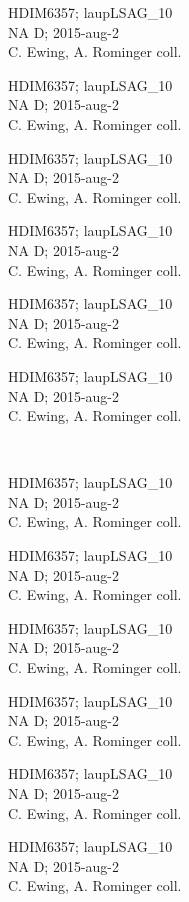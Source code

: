 \documentclass[2pt]{extarticle}
\begin{document}
\noindent
\parbox{0.16\textwidth}{\tiny \raggedright \rule[-0.3\baselineskip]{0pt}{10pt}HDIM6357; laupLSAG\_10\\ NA D; 2015-aug-2\\ C. Ewing, A. Rominger coll.}
\parbox{0.16\textwidth}{\tiny \raggedright \rule[-0.3\baselineskip]{0pt}{10pt}HDIM6357; laupLSAG\_10\\ NA D; 2015-aug-2\\ C. Ewing, A. Rominger coll.}
\parbox{0.16\textwidth}{\tiny \raggedright \rule[-0.3\baselineskip]{0pt}{10pt}HDIM6357; laupLSAG\_10\\ NA D; 2015-aug-2\\ C. Ewing, A. Rominger coll.}
\parbox{0.16\textwidth}{\tiny \raggedright \rule[-0.3\baselineskip]{0pt}{10pt}HDIM6357; laupLSAG\_10\\ NA D; 2015-aug-2\\ C. Ewing, A. Rominger coll.}
\parbox{0.16\textwidth}{\tiny \raggedright \rule[-0.3\baselineskip]{0pt}{10pt}HDIM6357; laupLSAG\_10\\ NA D; 2015-aug-2\\ C. Ewing, A. Rominger coll.}
\parbox{0.16\textwidth}{\tiny \raggedright \rule[-0.3\baselineskip]{0pt}{10pt}HDIM6357; laupLSAG\_10\\ NA D; 2015-aug-2\\ C. Ewing, A. Rominger coll.} \\ 
\vspace{0.001in} 

\noindent
\parbox{0.16\textwidth}{\tiny \raggedright \rule[-0.3\baselineskip]{0pt}{10pt}HDIM6357; laupLSAG\_10\\ NA D; 2015-aug-2\\ C. Ewing, A. Rominger coll.}
\parbox{0.16\textwidth}{\tiny \raggedright \rule[-0.3\baselineskip]{0pt}{10pt}HDIM6357; laupLSAG\_10\\ NA D; 2015-aug-2\\ C. Ewing, A. Rominger coll.}
\parbox{0.16\textwidth}{\tiny \raggedright \rule[-0.3\baselineskip]{0pt}{10pt}HDIM6357; laupLSAG\_10\\ NA D; 2015-aug-2\\ C. Ewing, A. Rominger coll.}
\parbox{0.16\textwidth}{\tiny \raggedright \rule[-0.3\baselineskip]{0pt}{10pt}HDIM6357; laupLSAG\_10\\ NA D; 2015-aug-2\\ C. Ewing, A. Rominger coll.}
\parbox{0.16\textwidth}{\tiny \raggedright \rule[-0.3\baselineskip]{0pt}{10pt}HDIM6357; laupLSAG\_10\\ NA D; 2015-aug-2\\ C. Ewing, A. Rominger coll.}
\parbox{0.16\textwidth}{\tiny \raggedright \rule[-0.3\baselineskip]{0pt}{10pt}HDIM6357; laupLSAG\_10\\ NA D; 2015-aug-2\\ C. Ewing, A. Rominger coll.} \\ 
\vspace{0.001in} 
\end{document}
